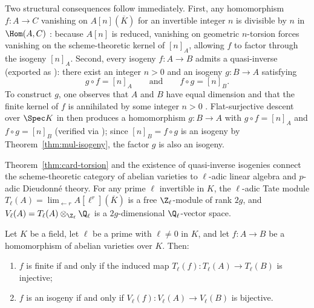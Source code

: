 Two structural consequences follow immediately. First, any homomorphism
$f : A \to C$ vanishing on $A[n](\overline{K})$ for an invertible integer $n$
is divisible by $n$ in $\Hom(A, C)$
: because
$A[n]$ is reduced, vanishing on geometric $n$-torsion forces vanishing on the
scheme-theoretic kernel of $[n]_A$, allowing $f$ to factor through the isogeny
$[n]_A$. Second, every isogeny $f : A \to B$ admits a quasi-inverse
 (exported as
): there exist an
integer $n > 0$ and an isogeny $g : B \to A$ satisfying
\[
  g \circ f = [n]_A \qquad \text{and} \qquad f \circ g = [n]_B.
\]
To construct $g$, one observes that $A$ and $B$ have equal dimension and that
the finite kernel of $f$ is annihilated by some integer $n > 0$
. Flat-surjective descent over
$\Spec K$ in 
then produces a homomorphism $g : B \to A$ with $g \circ f = [n]_A$ and
$f \circ g = [n]_B$ (verified via );
since $[n]_B = f \circ g$ is an isogeny by Theorem~\ref{thm:mul-isogeny}, the
factor $g$ is also an isogeny.

Theorem~\ref{thm:card-torsion} and the existence of quasi-inverse isogenies
connect the scheme-theoretic category of abelian varieties to $\ell$-adic
linear algebra and $p$-adic Dieudonné theory. For any prime $\ell$ invertible
in $K$, the $\ell$-adic Tate module
$T_\ell(A) = \lim_{\leftarrow r} A[\ell^r](\overline{K})$ is a free
$\Z_\ell$-module of rank $2g$, and
$V_\ell(A) = T_\ell(A) \otimes_{\Z_\ell} \Q_\ell$ is a $2g$-dimensional
$\Q_\ell$-vector space.

\begin{proposition}
\label{prop:tate-isogeny}
Let $K$ be a field, let $\ell$ be a prime with $\ell \neq 0$ in $K$, and let
$f : A \to B$ be a homomorphism of abelian varieties over $K$. Then:
\begin{enumerate}
  \item $f$ is finite if and only if the induced map
  $T_\ell(f) : T_\ell(A) \to T_\ell(B)$ is injective;
  \item $f$ is an isogeny if and only if
  $V_\ell(f) : V_\ell(A) \to V_\ell(B)$ is bijective.
\end{enumerate}
\end{proposition}


